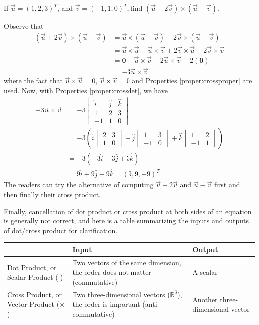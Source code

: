 \begin{exmp}
If $\vec{u} = (1,2,3)^T$, and $\vec{v} = (-1,1,0)^T$, find $(\vec{u} + 2\vec{v}) \times (\vec{u} - \vec{v}) $.
\end{exmp}
\begin{solution}
Observe that
\begin{align*}
(\vec{u} + 2\vec{v}) \times (\vec{u} - \vec{v}) &= \vec{u} \times (\vec{u} - \vec{v}) + 2\vec{v} \times (\vec{u} - \vec{v}) \\
&= \vec{u} \times \vec{u} - \vec{u} \times \vec{v} + 2\vec{v} \times \vec{u} - 2\vec{v} \times \vec{v} \\
&= \textbf{0} - \vec{u} \times \vec{v} - 2\vec{u} \times \vec{v} - 2(\textbf{0}) \\
&= -3\vec{u} \times \vec{v}
\end{align*}
where the fact that $\vec{u} \times \vec{u} = 0$, $\vec{v} \times \vec{v} = 0$ and Properties \ref{proper:crossproper} are used. Now, with Properties \ref{proper:crossdet}, we have
\begin{align*}
-3\vec{u} \times \vec{v} &=  
-3
\begin{vmatrix}
\hat{i} & \hat{j} & \hat{k} \\
1 & 2 & 3 \\
-1 & 1 & 0
\end{vmatrix} \\
&= -3\left(\hat{i}
\begin{vmatrix}
2 & 3 \\
1 & 0 
\end{vmatrix}
- \hat{j}
\begin{vmatrix}
1 & 3 \\
-1 & 0 
\end{vmatrix}
+ \hat{k}
\begin{vmatrix}
1 & 2 \\
-1 & 1 
\end{vmatrix}\right) \\
&= -3(-3\hat{i}-3\hat{j}+3\hat{k}) \\
&= 9\hat{i}+9\hat{j}-9\hat{k} = (9,9,-9)^T
\end{align*}
The readers can try the alternative of computing $\vec{u}+2\vec{v}$ and $\vec{u} - \vec{v}$ first and then finally their cross product.
\end{solution}

Finally, cancellation of dot product or cross product at both sides of an equation is generally not correct, and here is a table summarizing the inputs and outputs of dot/cross product for clarification.
\begin{center}
\begin{tabular}{|p{35mm}|p{55mm}|p{25mm}|}
\hline
 & Input & Output \\
\hline
Dot Product, or Scalar Product ($\cdot$) & Two vectors of the same dimension, the order does not matter (commutative) & A scalar\\
\hline
Cross Product, or Vector Product ($\times$) & Two three-dimensional vectors ($\mathbb{R}^3$), the order is important (anti-commutative) & Another three-dimensional vector
\\
\hline
\end{tabular}
\end{center}

